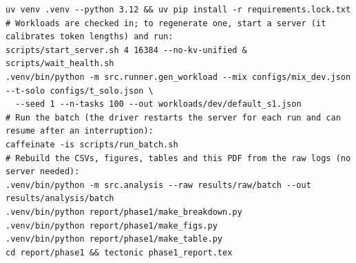 \documentclass{article}
\begin{document}
{\footnotesize
\begin{verbatim}
uv venv .venv --python 3.12 && uv pip install -r requirements.lock.txt
# Workloads are checked in; to regenerate one, start a server (it calibrates token lengths) and run:
scripts/start_server.sh 4 16384 --no-kv-unified & scripts/wait_health.sh
.venv/bin/python -m src.runner.gen_workload --mix configs/mix_dev.json --t-solo configs/t_solo.json \
  --seed 1 --n-tasks 100 --out workloads/dev/default_s1.json
# Run the batch (the driver restarts the server for each run and can resume after an interruption):
caffeinate -is scripts/run_batch.sh
# Rebuild the CSVs, figures, tables and this PDF from the raw logs (no server needed):
.venv/bin/python -m src.analysis --raw results/raw/batch --out results/analysis/batch
.venv/bin/python report/phase1/make_breakdown.py
.venv/bin/python report/phase1/make_figs.py
.venv/bin/python report/phase1/make_table.py
cd report/phase1 && tectonic phase1_report.tex
\end{verbatim}
}
\end{document}
